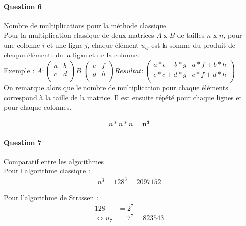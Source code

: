 \documentclass[a4paper,10pt,margin=2in]{report}
\begin{document}
\paragraph{Question 6}
Nombre de multiplications pour la méthode classique\\

Pour la multiplication classique de deux matrices $A$ x $B$ de tailles $n$ x $n$, pour une colonne $i$ et une ligne $j$, chaque élément $u_{ij}$ est la somme du produit de chaque éléments de la ligne et de la colonne.\\

Exemple :
\begin{math}
A : \begin{pmatrix}
a &b\\
c &d\\
\end{pmatrix}
B : \begin{pmatrix}
e &f\\
g &h\\
\end{pmatrix}
Resultat : \begin{pmatrix}
a*e + b * g &a*f + b*h\\
c*e + d * g &c*f + d*h\\
\end{pmatrix}
\end{math}\\

On remarque alors que le nombre de multiplication pour chaque éléments correspond à la taille de la matrice. Il est ensuite répété pour chaque lignes et pour chaque colonnes.

\begin{align*}
n*n*n = \boldsymbol{n^3}
\end{align*}

\paragraph{Question 7}
Comparatif entre les algorithmes\\

Pour l'algorithme classique :
\begin{align*}
n^3 = 128^3 = 2 097 152
\end{align*}

Pour l'algorithme de Strassen :
\begin{align*}
128 &= 2^7\\
\iff u_7 &= 7^7 = 823 543
\end{align*}
\end{document}
